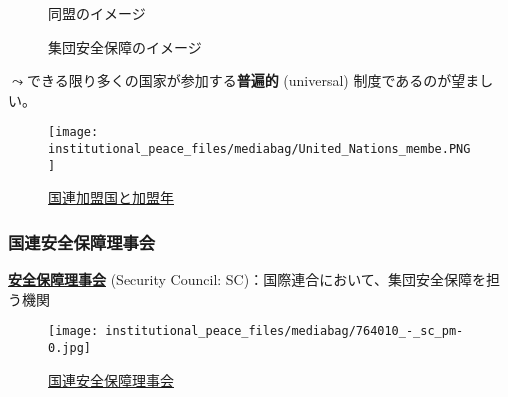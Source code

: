 \documentclass[
  xelatex,
  ja=standard]{bxjsarticle}
\begin{document}
\begin{figure}

\begin{minipage}[t]{0.50\linewidth}

{\centering 


\caption{同盟のイメージ}

}

\end{minipage}%
%
\begin{minipage}[t]{0.50\linewidth}

{\centering 


\caption{集団安全保障のイメージ}

}

\end{minipage}%

\end{figure}

\(\leadsto\)できる限り多くの国家が参加する\textbf{普遍的} (universal)
制度であるのが望ましい。

\begin{figure}[htpb]

{\centering \texttt{[image: institutional\_peace\_files/mediabag/United\_Nations\_membe.PNG]}

}

\caption{\href{https://commons.wikimedia.org/wiki/File:United_Nations_member_countries_world_map.PNG}{国連加盟国と加盟年}}

\end{figure}

\hypertarget{ux56fdux9023ux5b89ux5168ux4fddux969cux7406ux4e8bux4f1a}{%
\subsubsection{国連安全保障理事会}\label{ux56fdux9023ux5b89ux5168ux4fddux969cux7406ux4e8bux4f1a}}

\href{https://www.un.org/securitycouncil/}{\textbf{安全保障理事会}}
(Security Council: SC)：国際連合において、集団安全保障を担う機関

\begin{figure}[htpb]

{\centering \texttt{[image: institutional\_peace\_files/mediabag/764010\_-\_sc\_pm-0.jpg]}

}

\caption{\href{https://www.un.org/securitycouncil/content/what-security-council}{国連安全保障理事会}}

\end{figure}
\end{document}
